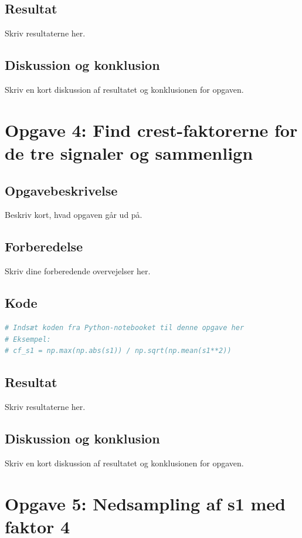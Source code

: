 ﻿\documentclass[11pt,a4paper]{report}
\begin{document}
\subsection{Resultat}
Skriv resultaterne her.

\subsection{Diskussion og konklusion}
Skriv en kort diskussion af resultatet og konklusionen for opgaven.

\newpage

\section{Opgave 4: Find crest-faktorerne for de tre signaler og sammenlign}
\subsection{Opgavebeskrivelse}
Beskriv kort, hvad opgaven går ud på.

\subsection{Forberedelse}
Skriv dine forberedende overvejelser her.

\subsection{Kode}
\begin{lstlisting}[language=Python]
# Indsæt koden fra Python-notebooket til denne opgave her
# Eksempel:
# cf_s1 = np.max(np.abs(s1)) / np.sqrt(np.mean(s1**2))
\end{lstlisting}

\subsection{Resultat}
Skriv resultaterne her.

\subsection{Diskussion og konklusion}
Skriv en kort diskussion af resultatet og konklusionen for opgaven.

\newpage

\section{Opgave 5: Nedsampling af s1 med faktor 4}
\end{document}
